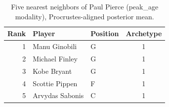 \begin{table}[htbp]
  \centering\small
  \begin{tabular}{rllc}
    \toprule
    Rank & Player & Position & Archetype \\
    \midrule
    1 & Manu Ginobili & G & 1 \\
    2 & Michael Finley & G & 1 \\
    3 & Kobe Bryant & G & 1 \\
    4 & Scottie Pippen & F & 1 \\
    5 & Arvydas Sabonis & C & 1 \\
    \bottomrule
  \end{tabular}
  \caption{Five nearest neighbors of Paul Pierce (peak_age modality), Procrustes-aligned posterior mean.}
  \label{tab:Paul_Pierce_neighbors_peak_age}
\end{table}

